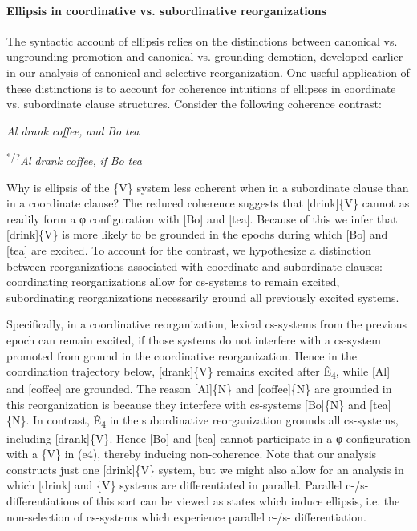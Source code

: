 \paragraph{Ellipsis in coordinative vs. subordinative reorganizations}

The syntactic account of ellipsis relies on the distinctions between canonical vs. ungrounding promotion and canonical vs. grounding demotion, developed earlier in our analysis of canonical and selective reorganization. One useful application of these distinctions is to account for coherence intuitions of ellipses in coordinate vs. subordinate clause structures. Consider the following coherence contrast:

    \textit{Al} \textit{drank} \textit{coffee,} \textit{and} \textit{Bo} \textit{tea}

    \textsuperscript{*/?}\textit{Al} \textit{drank} \textit{coffee,} \textit{if} \textit{Bo} \textit{tea}

  Why is ellipsis of the \{V\} system less coherent when in a subordinate clause than in a coordinate clause? The reduced coherence suggests that [drink]\{V\} cannot as readily form a φ configuration with [Bo] and [tea]. Because of this we infer that [drink]\{V\} is more likely to be grounded in the epochs during which [Bo] and [tea] are excited. To account for the contrast, we hypothesize a distinction between reorganizations associated with coordinate and subordinate clauses: coordinating reorganizations allow for cs-systems to remain excited, subordinating reorganizations necessarily ground all previously excited systems. 

  Specifically, in a coordinative reorganization, lexical cs-systems from the previous epoch can remain excited, if those systems do not interfere with a cs-system promoted from ground in the coordinative reorganization. Hence in the coordination trajectory below, [drank]\{V\} remains excited after Ê\textsubscript{4}, while [Al] and [coffee] are grounded. The reason [Al]\{N\} and [coffee]\{N\} are grounded in this reorganization is because they interfere with cs-systems [Bo]\{N\} and [tea]\{N\}. In contrast, Ê\textsubscript{4} in the subordinative reorganization grounds all cs-systems, including [drank]\{V\}. Hence [Bo] and [tea] cannot participate in a φ configuration with a \{V\} in (e4), thereby inducing non-coherence. Note that our analysis constructs just one [drink]\{V\} system, but we might also allow for an analysis in which [drink] and \{V\} systems are differentiated in parallel. Parallel c-/s- differentiations of this sort can be viewed as states which induce ellipsis, i.e. the non-selection of cs-systems which experience parallel c-/s- differentiation.

